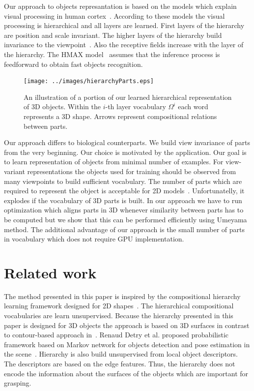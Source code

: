 \documentclass[letterpaper,10pt,conference]{ieeeconf}  %
\begin{document}
Our approach to objects represantation is based on the models which explain visual processing in human cortex~\cite{Riesenhuber1999}. According to these models the visual processing is hierarchical and all layers are learned. First layers of the hierarchy are position and scale invariant. The higher layers of the hierarchy build invariance to the viewpoint~\cite{Spehr2015}. Also the receptive fields increase with the layer of the hierarchy. The HMAX model~\cite{Serre2007} assumes that the inference process is feedforward to obtain fast objects recognition.

\begin{figure}[t]
 \centering
\texttt{[image: ../images/hierarchyParts.eps]}
\caption{An illustration of a portion of our learned hierarchical representation of 3D objects. Within the $i$-th layer vocabulary $\Omega^i$ each word represents a 3D shape. Arrows represent compositional relations between parts.}
 \label{hierarchyParts}
\end{figure}

Our approach differs to biological counterparts. We build view invariance of parts from the very beginning. Our choice is motivated by the application. Our goal is to learn representation of objects from minimal number of examples. For view-variant representations the objects used for training should be observed from many viewpoints to build sufficient vocabulary. The number of parts which are required to represent the object is acceptable for 2D models~\cite{Fiedler2014}. Unfortunatelly, it explodes if the vocabulary of 3D parts is built. In our approach we have to run optimization which aligns parts in 3D whenever similarity between parts has to be computed but we show that this can be performed efficiently using Umeyama method. The additional advantage of our approach is the small number of parts in vocabulary which does not require GPU implementation.

\section{Related work}

The method presented in this paper is inspired by the compositional hierarchy learning framework designed for 2D shapes~\cite{Fiedler2014}. The hierarchical compositional vocabularies are learn unsupervised. Because the hierarchy presented in this paper is designed for 3D objects the approach is based on 3D surfaces in contrast to contour-based approach in~\cite{Fiedler2014}. Renaud Detry et al. proposed probabilistic framework based on Markov network for objects detection and pose estimation in the scene~\cite{Detry2009}. Hierarchy is also build unsupervised from local object descriptors. The descriptors are based on the edge features. Thus, the hierarchy does not encode the information about the surfaces of the objects which are important for grasping.
\end{document}
